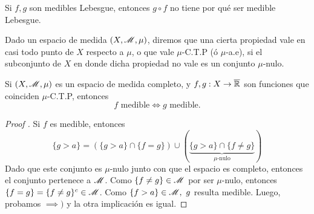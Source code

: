 \begin{remark}
	Si $f,g$ son medibles Lebesgue, entonces $g \circ f$ no tiene por qué ser medible Lebesgue.
\end{remark}

\begin{definition}
	Dado un espacio de medida $(X, \mathscr{M}, \mu)$, diremos que una cierta propiedad vale en casi todo punto de $X$ respecto a $\mu$, o que vale $\mu$-C.T.P (ó $\mu$-a.e), si el subconjunto de $X$ en donde dicha propiedad no vale es un conjunto $\mu$-nulo.
\end{definition}

\begin{prop}
	Si $(X, \mathscr{M}, \mu)$ es un espacio de medida completo, y $f,g : X \to \overline{\mathbb{R}}$ son funciones que coinciden $\mu$-C.T.P, entonces
	\[ f \text{ medible} \iff g \text{ medible}. \]
\end{prop}
\begin{proof}[Proof ]
	Si $f$ es medible, entonces
	\[ \{g > a\} = (\{g > a\} \cap \{f=g\}) \cup (\underbrace{\{g>a\} \cap \{f \neq g\}}_{\mu \text{-nulo}}) \]
	Dado que este conjunto es $\mu$-nulo junto con que el espacio es completo, entonces el conjunto pertenece a $\mathscr{M}$. Como $\{f \neq g\} \in \mathscr{M}$ por ser $\mu$-nulo, entonces $\{f=g\} = \{f \neq g\}^c \in \mathscr{M}$. Como $\{f>a\} \in \mathscr{M},\ g$ resulta medible. Luego, probamos $\implies)$ y la otra implicación es igual.
\end{proof}
